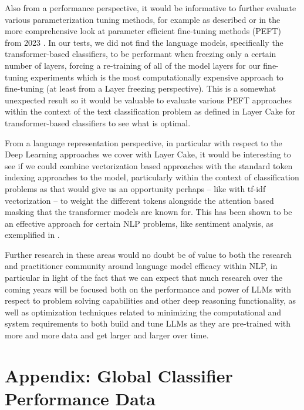 \documentclass[final]{clv2025}
\begin{document}
Also from a performance perspective, it would be informative to further evaluate various parameterization tuning methods, for example as described \cite{lee} or in the more comprehensive look at parameter efficient fine-tuning methods (PEFT) from 2023 \cite{articleding}. In our tests, we did not find the language models, specifically the transformer-based classifiers, to be performant when freezing only a certain number of layers, forcing a re-training of all of the model layers for our fine-tuning experiments which is the most computationally expensive approach to fine-tuning (at least from a Layer freezing perspective). This is a somewhat unexpected result so it would be valuable to evaluate various PEFT approaches within the context of the text classification problem as defined in Layer Cake for transformer-based classifiers to see what is optimal. 

From a language representation perspective, in particular with respect to the Deep Learning approaches we cover with Layer Cake, it would be interesting to see if we could combine vectorization based approaches with the standard token indexing approaches to the model, particularly within the context of classification problems as that would give us an opportunity perhaps – like with tf-idf vectorization – to weight the different tokens alongside the attention based masking that the transformer models are known for. This has been shown to be an effective approach for certain NLP problems, like sentiment analysis, as exemplified in \cite{liang2022research} \cite{zhao2022research} \cite{kamyab2021attention}.

Further research in these areas would no doubt be of value to both the research and practitioner community around language model efficacy within NLP, in particular in light of the fact that we can expect that much research over the coming years will be focused both on the performance and power of LLMs with respect to problem solving capabilities and other deep reasoning functionality, as well as optimization techniques related to minimizing the computational and system requirements to both build and tune LLMs as they are pre-trained with more and more data and get larger and larger over time.






\section{Appendix: Global Classifier Performance Data}
\end{document}
